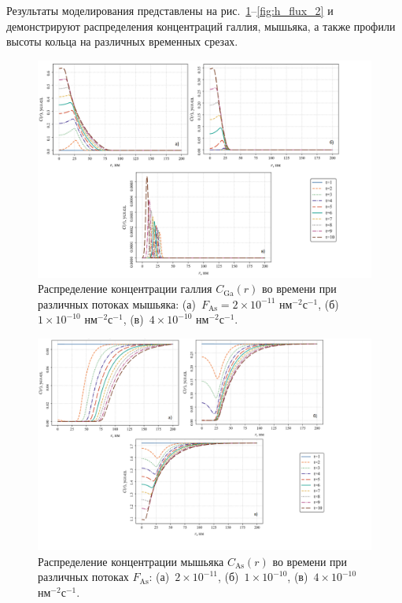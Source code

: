 \documentclass[14pt,oneside]{extarticle}
\begin{document}
Результаты моделирования представлены на рис.~\ref{fig:ga_flux_2}–\ref{fig:h_flux_2} и демонстрируют распределения концентраций галлия, мышьяка, а также профили высоты кольца на различных временных срезах.

\begin{figure}[H]
    \begin{center}
    \includegraphics[width=15cm]{images/C_Ga_t_2.png}
    \caption{\label{fig:ga_flux_2} Распределение концентрации галлия $C_{\text{Ga}}(r)$ во времени при различных потоках мышьяка: (а)~$F_{\text{As}} = 2 \times 10^{-11}$ нм$^{-2}$с$^{-1}$, (б)~$1 \times 10^{-10}$ нм$^{-2}$с$^{-1}$, (в)~$4 \times 10^{-10}$ нм$^{-2}$с$^{-1}$.}
    \end{center}
\end{figure}

\begin{figure}[H]
    \begin{center}
    \includegraphics[width=15cm]{images/C_As_t_2.png}
    \caption{\label{fig:as_flux_2} Распределение концентрации мышьяка $C_{\text{As}}(r)$ во времени при различных потоках $F_{\text{As}}$: (а)~$2 \times 10^{-11}$, (б)~$1 \times 10^{-10}$, (в)~$4 \times 10^{-10}$ нм$^{-2}$с$^{-1}$.}
    \end{center}
\end{figure}
\end{document}
